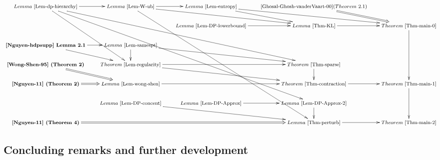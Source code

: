 \documentclass[MSNbibl,number,citesort]{arxbj}
\begin{document}
\noindent\[
%
\fontsize{8}{10}\selectfont
\xymatrix@C=0.60cm @R=0.60cm{
Lemma~\ref{Lem-dp-hierarchy}\ar[r]\ar[dddr]\ar[dddddrrr]\ar[dddrrr] &
Lemma~\ref{Lem-W-ub}\ar[r]\ar[ddddddrr]\ar[drr] &
Lemma~\ref {Lem-entropy} \ar[dr]\ar[drr]&
{\mbox{\cite{Ghosal-Ghosh-vanderVaart-00}}
 (Theorem~2.1)}\ar@{=>}[dr] & \\
& & Lemma~\ref{Lem-DP-lowerbound}\ar[r] & Lemma~\ref{Thm-KL}\ar[r] & Theorem~\ref{Thm-main-0}\ar[ddd]\\
\mbox{\textbf{\cite{Nguyen-hdpsupp}\  Lemma~2.1}}\ar[r]\ar[dr] & Lemma~\ref{Lem-samespt}\ar[d]\ar[drr] & & &\\
%
\mbox{\textbf{\cite{Wong-Shen-95}\ (Theorem~2)}}\ar@{=>}[dr]& Theorem~\ref{Lem-regularity}\ar[drr] \ar[rr]& & Theorem~\ref{Thm-sparse}\ar[d] & \\
%
\mbox{\textbf{\cite{Nguyen-11}\ (Theorem~2)}}\ar@{=>}[r] & Lemma~\ref{Lem-wong-shen}\ar[rr] & & Theorem~\ref{Thm-contraction}\ar[r] &Theorem~\ref{Thm-main-1}\ar[dd] \\
%
& Lemma~\ref{Lem-DP-concent}\ar[drr] & Lemma~\ref{Lem-DP-Approx}\ar[r] & Lemma~\ref{Lem-DP-Approx-2}\ar[d] & \\
%
\mbox{\textbf{\cite{Nguyen-11}\ (Theorem~4)}}\ar@{=>}[rrr] & & & Lemma~\ref{Thm-perturb}\ar[r] & Theorem~\ref{Thm-main-2}
}
\]
%

\subsection{Concluding remarks and further development}
\end{document}
